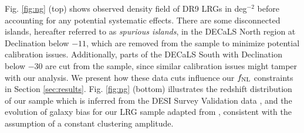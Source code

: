 Fig. \ref{fig:ng} (top) shows observed density field of DR9 LRGs in deg$^{-2}$ before accounting for any potential systematic effects. There are some disconnected islands, hereafter referred to as \textit{spurious islands}, in the DECaLS North region at Declination below $-11$, which are removed from the sample to minimize potential calibration issues. Additionally, parts of the DECaLS South with Declination below $-30$ are cut from the sample, since similar calibration issues might tamper with our analysis. We present  how these data cuts influence our $f_{\rm NL}$ constraints in Section \ref{sec:results}. Fig. \ref{fig:ng} (bottom) illustrates the redshift distribution of our sample which is inferred from the DESI Survey Validation data , and the evolution of  galaxy bias for our LRG sample adapted from \cite{zhou2021clustering}, consistent with the assumption of a constant clustering amplitude.

